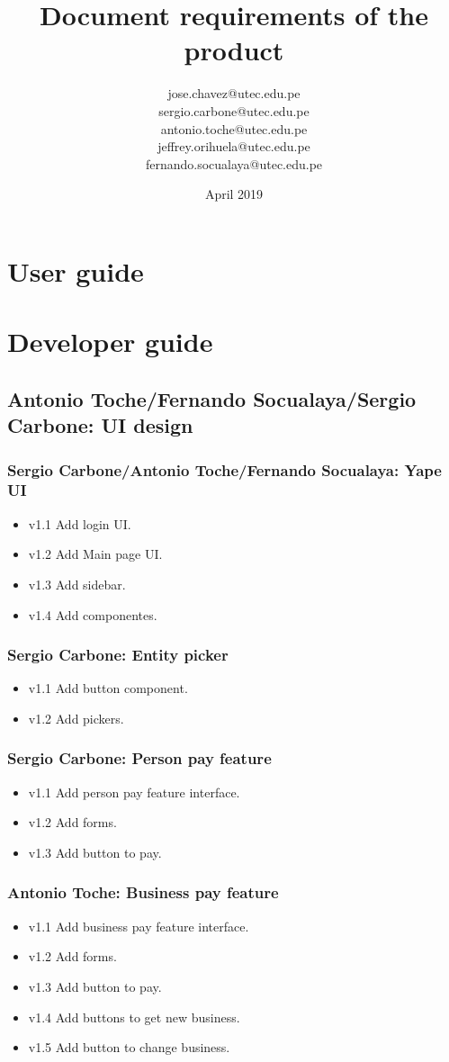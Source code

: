 \documentclass{article}
\title{Document requirements of the product}
\author{jose.chavez@utec.edu.pe \\ sergio.carbone@utec.edu.pe\\antonio.toche@utec.edu.pe\\jeffrey.orihuela@utec.edu.pe\\fernando.socualaya@utec.edu.pe}
\date{April 2019}
\begin{document}
\maketitle

\section{User guide}
 

\section{Developer guide}
 \subsection{Antonio Toche/Fernando Socualaya/Sergio Carbone: UI design}
 \blindtext
\subsubsection{Sergio Carbone/Antonio Toche/Fernando Socualaya: Yape UI}
\begin{itemize}
\item v1.1 Add login UI.
\item v1.2 Add Main page UI.
\item v1.3 Add sidebar.
\item v1.4 Add componentes.
\end{itemize}

\subsubsection{Sergio Carbone: Entity picker}
\begin{itemize}
\item v1.1 Add button component.
\item v1.2 Add pickers.
\end{itemize}

\subsubsection{Sergio Carbone: Person pay feature}
\begin{itemize}
\item v1.1 Add person pay feature interface.
\item v1.2 Add forms.
\item v1.3 Add button to pay.
\end{itemize}

\subsubsection{Antonio Toche: Business pay feature}
\begin{itemize}
\item v1.1 Add business pay feature interface.
\item v1.2 Add forms.
\item v1.3 Add button to pay.
\item v1.4 Add buttons to get new business.
\item v1.5 Add button to change business.
\end{itemize}
\end{document}
